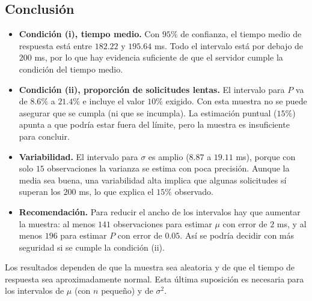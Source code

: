 \documentclass[10pt,letterpaper]{article}
\begin{document}
\subsection{Conclusión}

\begin{itemize}
    \item \textbf{Condición (i), tiempo medio.} Con $95\%$ de confianza, el tiempo medio de respuesta está entre $182.22$ y $195.64$ ms. Todo el intervalo está por debajo de $200$ ms, por lo que hay evidencia suficiente de que el servidor cumple la condición del tiempo medio.
    \item \textbf{Condición (ii), proporción de solicitudes lentas.} El intervalo para $P$ va de $8.6\%$ a $21.4\%$ e incluye el valor $10\%$ exigido. Con esta muestra no se puede asegurar que se cumpla (ni que se incumpla). La estimación puntual ($15\%$) apunta a que podría estar fuera del límite, pero la muestra es insuficiente para concluir.
    \item \textbf{Variabilidad.} El intervalo para $\sigma$ es amplio ($8.87$ a $19.11$ ms), porque con solo $15$ observaciones la varianza se estima con poca precisión. Aunque la media sea buena, una variabilidad alta implica que algunas solicitudes sí superan los $200$ ms, lo que explica el $15\%$ observado.
    \item \textbf{Recomendación.} Para reducir el ancho de los intervalos hay que aumentar la muestra: al menos $141$ observaciones para estimar $\mu$ con error de $2$ ms, y al menos $196$ para estimar $P$ con error de $0.05$. Así se podría decidir con más seguridad si se cumple la condición (ii).
\end{itemize}

Los resultados dependen de que la muestra sea aleatoria y de que el tiempo de respuesta sea aproximadamente normal. Esta última suposición es necesaria para los intervalos de $\mu$ (con $n$ pequeño) y de $\sigma^2$.
\end{document}
